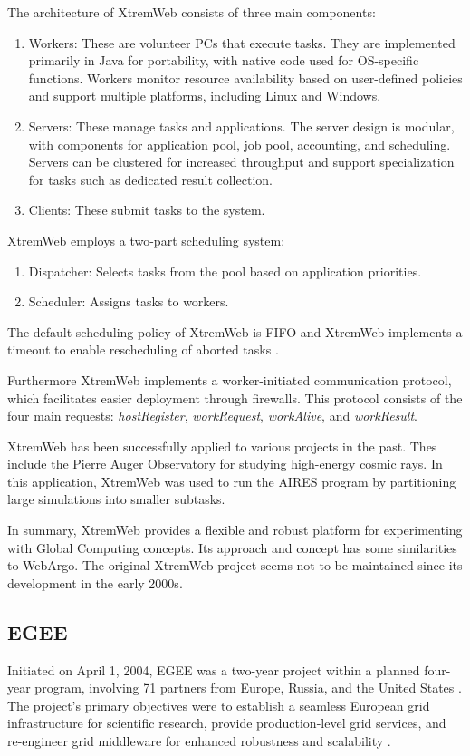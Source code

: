 The architecture of XtremWeb consists of three main components:
\begin{enumerate}
  \item Workers: These are volunteer PCs that execute tasks. They are implemented primarily in Java for portability, with native code used for OS-specific functions. Workers monitor resource availability based on user-defined policies and support multiple platforms, including Linux and Windows.
  \item Servers: These manage tasks and applications. The server design is modular, with components for application pool, job pool, accounting, and scheduling. Servers can be clustered for increased throughput and support specialization for tasks such as dedicated result collection.
  \item Clients: These submit tasks to the system.
\end{enumerate}
XtremWeb employs a two-part scheduling system:
\begin{enumerate}
  \item Dispatcher: Selects tasks from the pool based on application priorities.
  \item Scheduler: Assigns tasks to workers.
\end{enumerate}
The default scheduling policy of XtremWeb is \ac{FIFO} and XtremWeb implements a timeout to enable rescheduling of aborted tasks \cite{relatedwork:xtremweb}.

Furthermore XtremWeb implements a worker-initiated communication protocol, which facilitates easier deployment through firewalls. This protocol consists of the four main requests: \emph{hostRegister}, \emph{workRequest}, \emph{workAlive}, and \emph{workResult}. \cite{relatedwork:xtremweb}

XtremWeb has been successfully applied to various projects in the past. Thes include the Pierre Auger Observatory for studying high-energy cosmic rays. In this application, XtremWeb was used to run the \ac{AIRES} program by partitioning large simulations into smaller subtasks. \cite{relatedwork:xtremweb}

In summary, XtremWeb provides a flexible and robust platform for experimenting with Global Computing concepts. Its approach and concept has some similarities to WebArgo. The original XtremWeb project seems not to be maintained since its development in the early 2000s.

\subsection{EGEE}
\label{subsec:background:related_work:egee}
Initiated on April 1, 2004, \ac{EGEE} was a two-year project within a planned four-year program, involving 71 partners from Europe, Russia, and the United States \cite{relatedwork:egee}. The project's primary objectives were to establish a seamless European grid infrastructure for scientific research, provide production-level grid services, and re-engineer grid middleware for enhanced robustness and scalability \cite{relatedwork:egee}.

